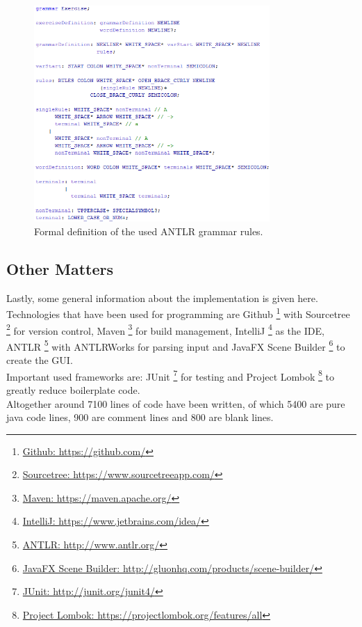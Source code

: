\begin{figure} [h]
	\centering 
	\includegraphics[width=0.8\textwidth]{abb/antrlRules.png}
	\caption{Formal definition of the used ANTLR grammar rules.}
	\label{antlrGrammarRules}
\end{figure}

\pagebreak
\subsection{Other Matters}
Lastly, some general information about the implementation is given here.\\
Technologies that have been used for programming are 
Github \footnote{\href{https://github.com/}{Github: https://github.com/}} with 
Sourcetree \footnote{\href{https://www.sourcetreeapp.com/}{Sourcetree: https://www.sourcetreeapp.com/}} for version control, 
Maven \footnote{\href{https://maven.apache.org/}{Maven: https://maven.apache.org/}} for build management, 
IntelliJ \footnote{\href{https://www.jetbrains.com/idea/}{IntelliJ: https://www.jetbrains.com/idea/}} as the IDE, 
ANTLR \footnote{\href{http://www.antlr.org/}{ANTLR: http://www.antlr.org/}} with ANTLRWorks for parsing input and 
JavaFX Scene Builder \footnote{\href{http://gluonhq.com/products/scene-builder/}{JavaFX Scene Builder: http://gluonhq.com/products/scene-builder/}} to create the GUI. \\
\noindent Important used frameworks are: 
JUnit \footnote{\href{http://junit.org/junit4/}{JUnit: http://junit.org/junit4/}} for testing and Project 
Lombok \footnote{\href{https://projectlombok.org/features/all}{Project Lombok: https://projectlombok.org/features/all}} to greatly reduce boilerplate code.\\
\noindent Altogether around 7100 lines of code have been written, of which 5400 are pure java code lines, 900 are comment lines and 800 are blank lines.\\ 

\pagebreak